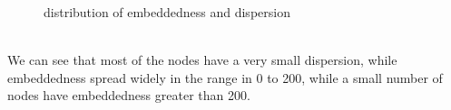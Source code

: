 \documentclass{article}
\begin{document}
\begin{figure}[htbp]
\centering
{}
\caption{distribution of embeddedness and dispersion}
\label{fig:p5_34}
\end{figure}
\\
We can see that most of the nodes have a very small dispersion, while embeddedness spread widely in the range in 0 to 200, while a small number of nodes have embeddedness greater than 200. 
\end{document}
